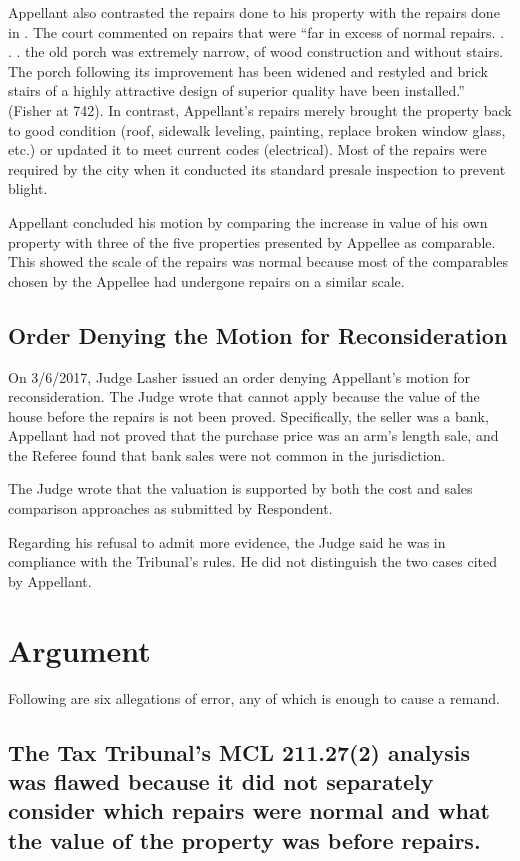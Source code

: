 \documentclass[12pt,\documentclassflag]{michiganCourtOfAppealsBrief}
\begin{document}
Appellant also contrasted the repairs done to his property with the repairs done in \cite[s]{Fisher}. The court commented on repairs that were ``far in excess of normal repairs. . . . the old porch was extremely narrow, of wood construction and without stairs. The porch following its improvement has been widened and restyled and brick stairs of a highly attractive design of superior quality have been installed.'' (Fisher at 742). In contrast, Appellant's repairs merely brought the property back to good condition (roof, sidewalk leveling, painting, replace broken window glass, etc.) or updated it to meet current codes (electrical). Most of the repairs were required by the city when it conducted its standard presale inspection to prevent blight.

Appellant concluded his motion by comparing the increase in value of his own property with three of the five properties presented by Appellee as comparable. This showed the scale of the repairs was normal because most of the comparables chosen by the Appellee had undergone repairs on a similar scale.

\subsection{Order Denying the Motion for Reconsideration}

On 3/6/2017, Judge Lasher issued an order denying Appellant's motion for reconsideration. The Judge wrote that  cannot apply because the value of the house before the repairs is not been proved. Specifically, the seller was a bank, Appellant had not proved that the purchase price was an arm's length sale, and the Referee found that bank sales were not common in the jurisdiction. 

The Judge wrote that the valuation is supported by both the cost and sales comparison approaches as submitted by Respondent. 

Regarding his refusal to admit more evidence, the Judge said he was in compliance with the Tribunal's rules. He did not distinguish the two cases cited by Appellant. 

\section{Argument}

Following are six allegations of error, any of which is enough to cause a remand. 


\subsection{The Tax Tribunal's MCL 211.27(2) analysis was flawed because it did not separately consider which repairs were normal and what the value of the property was before repairs.} \label{incoherent}
\end{document}
